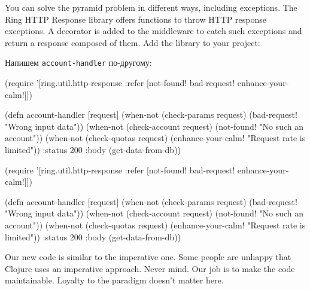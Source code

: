 
You can solve the pyramid problem in different ways, including exceptions. The Ring HTTP Response library offers functions to throw HTTP response exceptions. A decorator is added to the middleware to catch such exceptions and return a response composed of them. Add the library to your project:

\begin{english}
  \begin{clojure}
  \end{clojure}
\end{english}

Напишем \verb|account-handler| по-другому:


\ifx\DEVICETYPE\MOBILE

\begin{english}
  \begin{clojure}
(require '[ring.util.http-response
           :refer [not-found!
                   bad-request!
                   enhance-your-calm!]])

(defn account-handler [request]
  (when-not (check-params request)
    (bad-request! "Wrong input data"))
  (when-not (check-account request)
    (not-found! "No such an account"))
  (when-not (check-quotas request)
    (enhance-your-calm!
      "Request rate is limited"))
  {:status 200
   :body (get-data-from-db)})
  \end{clojure}
\end{english}

\else

\begin{english}
  \begin{clojure}
(require '[ring.util.http-response
           :refer [not-found!
                   bad-request!
                   enhance-your-calm!]])

(defn account-handler [request]
  (when-not (check-params request)
    (bad-request! "Wrong input data"))
  (when-not (check-account request)
    (not-found! "No such an account"))
  (when-not (check-quotas request)
    (enhance-your-calm! "Request rate is limited"))
  {:status 200
   :body (get-data-from-db)})
  \end{clojure}
\end{english}

\fi

Our new code is similar to the imperative one. Some people are unhappy that Clojure uses an imperative approach. Never mind. Our job is to make the code maintainable. Loyalty to the paradigm doesn't matter here.

